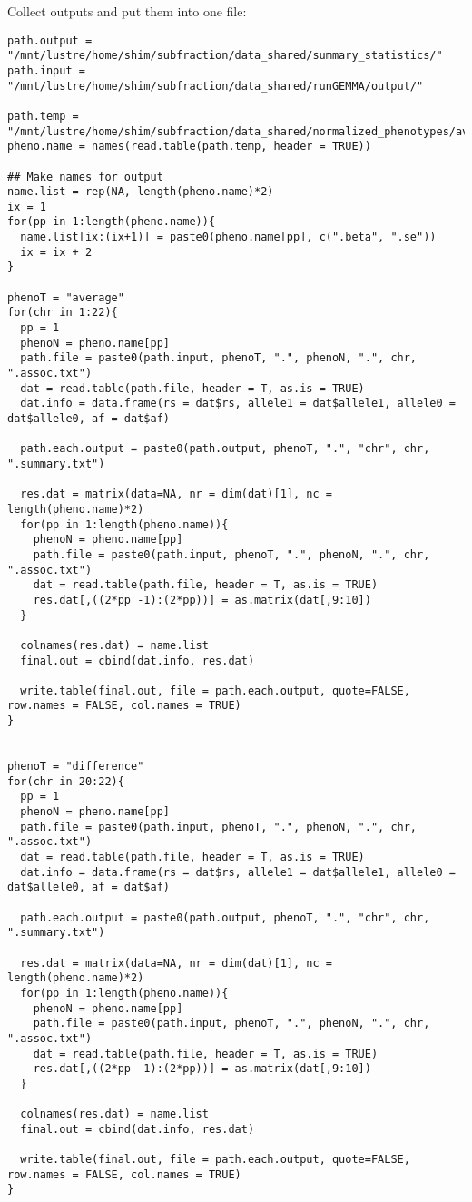 \documentclass[11pt]{article}
\begin{document}
Collect outputs and put them into one file: 
\begin{lstlisting}
path.output = "/mnt/lustre/home/shim/subfraction/data_shared/summary_statistics/"
path.input = "/mnt/lustre/home/shim/subfraction/data_shared/runGEMMA/output/"

path.temp = "/mnt/lustre/home/shim/subfraction/data_shared/normalized_phenotypes/average.txt"
pheno.name = names(read.table(path.temp, header = TRUE))

## Make names for output
name.list = rep(NA, length(pheno.name)*2)
ix = 1
for(pp in 1:length(pheno.name)){
  name.list[ix:(ix+1)] = paste0(pheno.name[pp], c(".beta", ".se"))
  ix = ix + 2
}

phenoT = "average"
for(chr in 1:22){
  pp = 1
  phenoN = pheno.name[pp]
  path.file = paste0(path.input, phenoT, ".", phenoN, ".", chr, ".assoc.txt")
  dat = read.table(path.file, header = T, as.is = TRUE)
  dat.info = data.frame(rs = dat$rs, allele1 = dat$allele1, allele0 = dat$allele0, af = dat$af)

  path.each.output = paste0(path.output, phenoT, ".", "chr", chr, ".summary.txt")
  
  res.dat = matrix(data=NA, nr = dim(dat)[1], nc = length(pheno.name)*2)
  for(pp in 1:length(pheno.name)){
    phenoN = pheno.name[pp]
    path.file = paste0(path.input, phenoT, ".", phenoN, ".", chr, ".assoc.txt")
    dat = read.table(path.file, header = T, as.is = TRUE)
    res.dat[,((2*pp -1):(2*pp))] = as.matrix(dat[,9:10])
  }
  
  colnames(res.dat) = name.list
  final.out = cbind(dat.info, res.dat)

  write.table(final.out, file = path.each.output, quote=FALSE, row.names = FALSE, col.names = TRUE)
}


phenoT = "difference"
for(chr in 20:22){
  pp = 1
  phenoN = pheno.name[pp]
  path.file = paste0(path.input, phenoT, ".", phenoN, ".", chr, ".assoc.txt")
  dat = read.table(path.file, header = T, as.is = TRUE)
  dat.info = data.frame(rs = dat$rs, allele1 = dat$allele1, allele0 = dat$allele0, af = dat$af)

  path.each.output = paste0(path.output, phenoT, ".", "chr", chr, ".summary.txt")
  
  res.dat = matrix(data=NA, nr = dim(dat)[1], nc = length(pheno.name)*2)
  for(pp in 1:length(pheno.name)){
    phenoN = pheno.name[pp]
    path.file = paste0(path.input, phenoT, ".", phenoN, ".", chr, ".assoc.txt")
    dat = read.table(path.file, header = T, as.is = TRUE)
    res.dat[,((2*pp -1):(2*pp))] = as.matrix(dat[,9:10])
  }
  
  colnames(res.dat) = name.list
  final.out = cbind(dat.info, res.dat)

  write.table(final.out, file = path.each.output, quote=FALSE, row.names = FALSE, col.names = TRUE)
}
\end{lstlisting}
\end{document}
